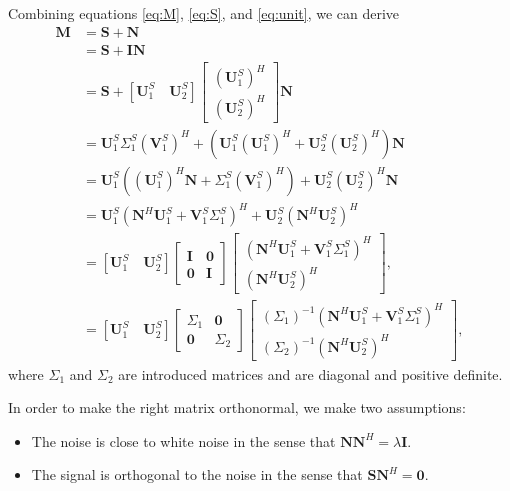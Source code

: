 Combining equations \ref{eq:M}, \ref{eq:S}, and \ref{eq:unit}, we can derive\new{:}
\begin{equation}
\label{eq:factorapp}
\begin{split}
\mathbf{M}&=\mathbf{S}+\mathbf{N} \\
&=\mathbf{S}+\mathbf{IN}\\
&=\mathbf{S}+[\mathbf{U}_1^S\quad \mathbf{U}_2^S]\left[\begin{array}{c} 
(\mathbf{U}_1^S)^H \\
(\mathbf{U}_2^S)^H
\end{array}
\right]\mathbf{N} \\
&=\mathbf{U}_1^S\Sigma_1^S(\mathbf{V}_1^S)^H + \left( 
\mathbf{U}_1^S(\mathbf{U}_1^S)^H+\mathbf{U}_2^S(\mathbf{U}_2^S)^H
\right)\mathbf{N}\\
&=\mathbf{U}_1^S \left(
(\mathbf{U}_1^S)^H\mathbf{N}+\Sigma_1^S(\mathbf{V}_1^S)^H
\right)+\mathbf{U}_2^S(\mathbf{U}_2^S)^H\mathbf{N}\\
&=\mathbf{U}_1^S\left(
\mathbf{N}^H\mathbf{U}_1^S+\mathbf{V}_1^S\Sigma_1^S
\right)^H + \mathbf{U}_2^S(\mathbf{N}^H\mathbf{U}_2^S)^H\\
&= [\mathbf{U}_1^S \quad \mathbf{U}_2^S]\left[\begin{array}{cc} 
\mathbf{I} & \mathbf{0}\\
\mathbf{0} & \mathbf{I}
\end{array}
\right]\left[\begin{array}{c} 
(\mathbf{N}^H\mathbf{U}_1^S+\mathbf{V}_1^S\Sigma_1^S)^H\\
(\mathbf{N}^H\mathbf{U}_2^S)^H
\end{array}
\right],\\
&= [\mathbf{U}_1^S \quad \mathbf{U}_2^S]\left[\begin{array}{cc} 
\Sigma_1 & \mathbf{0}\\
\mathbf{0} & \Sigma_2
\end{array}
\right]\left[\begin{array}{c} 
(\Sigma_1)^{-1}(\mathbf{N}^H\mathbf{U}_1^S+\mathbf{V}_1^S\Sigma_1^S)^H\\
(\Sigma_2)^{-1}(\mathbf{N}^H\mathbf{U}_2^S)^H
\end{array}
\right],
\end{split}
\end{equation}
where $\Sigma_1$ and $\Sigma_2$ are introduced  matrices and are diagonal and positive definite.

In order to make the right matrix orthonormal, we make two assumptions:
\begin{itemize}
\item The noise is close to white noise in the sense that $\mathbf{N}\mathbf{N}^H=\lambda\mathbf{I}$. 
\item The signal is orthogonal to the noise in the sense that $\mathbf{S}\mathbf{N}^H=\mathbf{0}$.
\end{itemize}

